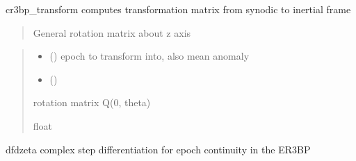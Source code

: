 \documentclass[letterpaper,10pt,english]{sphinxmanual}
\begin{document}

\begin{fulllineitems}
\label{\detokenize{models:pyraa.models.cr3bp_transform}}
\pysigstartsignatures
{}
\pysigstopsignatures
\sphinxAtStartPar
cr3bp\_transform \sphinxhyphen{} computes transformation matrix from synodic to inertial frame
\begin{quote}

\sphinxAtStartPar
General rotation matrix about z axis
\end{quote}
\begin{quote}\begin{description}
\begin{itemize}
\item {} 
\sphinxAtStartPar
{} () \sphinxhyphen{}\sphinxhyphen{} epoch to transform into, also mean anomaly

\item {} 
\sphinxAtStartPar
{} () \sphinxhyphen{}\sphinxhyphen{} 

\end{itemize}

\sphinxAtStartPar
{} \sphinxhyphen{}\sphinxhyphen{} rotation matrix Q(0, theta)

\sphinxAtStartPar
float

\end{description}\end{quote}

\end{fulllineitems}


\begin{fulllineitems}
\label{\detokenize{models:pyraa.models.dfdzeta}}
\pysigstartsignatures
{}
\pysigstopsignatures
\sphinxAtStartPar
dfdzeta \sphinxhyphen{} complex step differentiation for epoch continuity
in the ER3BP

\end{fulllineitems}
\end{document}
